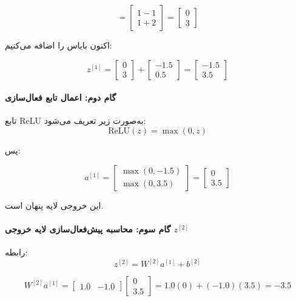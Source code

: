 \documentclass{article}
\begin{document}
\[
=
\begin{bmatrix}
	1 - 1 \\
	1 + 2
\end{bmatrix}
=
\begin{bmatrix}
	0 \\ 3
\end{bmatrix}
\]

اکنون بایاس را اضافه می‌کنیم:

\[
z^{[1]} =
\begin{bmatrix}
	0 \\ 3
\end{bmatrix}
+
\begin{bmatrix}
	-1.5 \\ 0.5
\end{bmatrix}
=
\begin{bmatrix}
	-1.5 \\ 3.5
\end{bmatrix}
\]

\paragraph{گام دوم: اعمال تابع فعال‌سازی }

تابع ReLU به‌صورت زیر تعریف می‌شود:
\[
\text{ReLU}(z)=\max(0,z)
\]

پس:

\[
a^{[1]}=
\begin{bmatrix}
	\max(0,-1.5) \\
	\max(0,3.5)
\end{bmatrix}
=
\begin{bmatrix}
	0 \\ 3.5
\end{bmatrix}
\]

این خروجی لایه پنهان است.

\paragraph{گام سوم: محاسبه پیش‌فعال‌سازی لایه خروجی \(z^{[2]}\)}

رابطه:
\[
z^{[2]} = W^{[2]} a^{[1]} + b^{[2]}
\]

\[
W^{[2]} a^{[1]} =
\begin{bmatrix}
	1.0 & -1.0
\end{bmatrix}
\begin{bmatrix}
	0 \\ 3.5
\end{bmatrix}
=
1.0(0) + (-1.0)(3.5) = -3.5
\]
\end{document}
